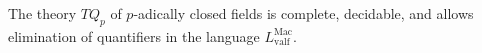 The theory $TQ_p$ of $p$-adically closed fields is complete, decidable, and allows elimination of quantifiers in the language $L_{\text{valf}}^{\text{Mac}}$.
